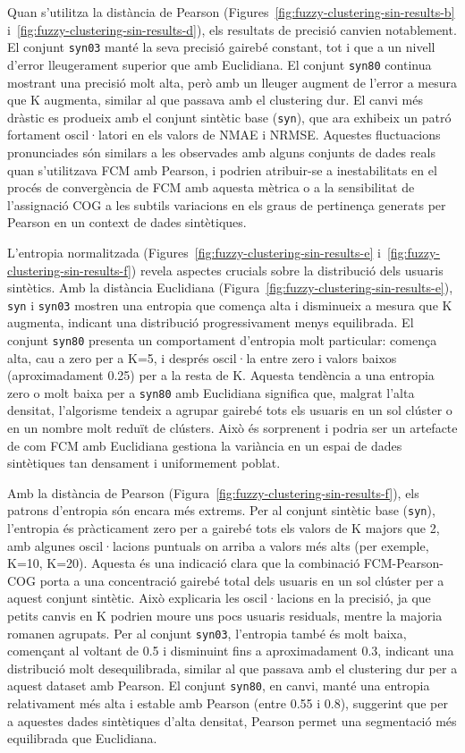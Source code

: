 \documentclass[a4paper,12pt]{report}
\begin{document}
Quan s'utilitza la distància de Pearson (Figures~\ref{fig:fuzzy-clustering-sin-results-b} i~\ref{fig:fuzzy-clustering-sin-results-d}), els resultats de precisió canvien notablement. El conjunt \texttt{syn03} manté la seva precisió gairebé constant, tot i que a un nivell d'error lleugerament superior que amb Euclidiana. El conjunt \texttt{syn80} continua mostrant una precisió molt alta, però amb un lleuger augment de l'error a mesura que K augmenta, similar al que passava amb el clustering dur. El canvi més dràstic es produeix amb el conjunt sintètic base (\texttt{syn}), que ara exhibeix un patró fortament oscil·latori en els valors de NMAE i NRMSE. Aquestes fluctuacions pronunciades són similars a les observades amb alguns conjunts de dades reals quan s'utilitzava FCM amb Pearson, i podrien atribuir-se a inestabilitats en el procés de convergència de FCM amb aquesta mètrica o a la sensibilitat de l'assignació COG a les subtils variacions en els graus de pertinença generats per Pearson en un context de dades sintètiques.

L'entropia normalitzada (Figures~\ref{fig:fuzzy-clustering-sin-results-e} i~\ref{fig:fuzzy-clustering-sin-results-f}) revela aspectes crucials sobre la distribució dels usuaris sintètics. Amb la distància Euclidiana (Figura~\ref{fig:fuzzy-clustering-sin-results-e}), \texttt{syn} i \texttt{syn03} mostren una entropia que comença alta i disminueix a mesura que K augmenta, indicant una distribució progressivament menys equilibrada. El conjunt \texttt{syn80} presenta un comportament d'entropia molt particular: comença alta, cau a zero per a K=5, i després oscil·la entre zero i valors baixos (aproximadament 0.25) per a la resta de K. Aquesta tendència a una entropia zero o molt baixa per a \texttt{syn80} amb Euclidiana significa que, malgrat l'alta densitat, l'algorisme tendeix a agrupar gairebé tots els usuaris en un sol clúster o en un nombre molt reduït de clústers. Això és sorprenent i podria ser un artefacte de com FCM amb Euclidiana gestiona la variància en un espai de dades sintètiques tan densament i uniformement poblat.

Amb la distància de Pearson (Figura~\ref{fig:fuzzy-clustering-sin-results-f}), els patrons d'entropia són encara més extrems. Per al conjunt sintètic base (\texttt{syn}), l'entropia és pràcticament zero per a gairebé tots els valors de K majors que 2, amb algunes oscil·lacions puntuals on arriba a valors més alts (per exemple, K=10, K=20). Aquesta és una indicació clara que la combinació FCM-Pearson-COG porta a una concentració gairebé total dels usuaris en un sol clúster per a aquest conjunt sintètic. Això explicaria les oscil·lacions en la precisió, ja que petits canvis en K podrien moure uns pocs usuaris residuals, mentre la majoria romanen agrupats. Per al conjunt \texttt{syn03}, l'entropia també és molt baixa, començant al voltant de 0.5 i disminuint fins a aproximadament 0.3, indicant una distribució molt desequilibrada, similar al que passava amb el clustering dur per a aquest dataset amb Pearson. El conjunt \texttt{syn80}, en canvi, manté una entropia relativament més alta i estable amb Pearson (entre 0.55 i 0.8), suggerint que per a aquestes dades sintètiques d'alta densitat, Pearson permet una segmentació més equilibrada que Euclidiana.
\end{document}
